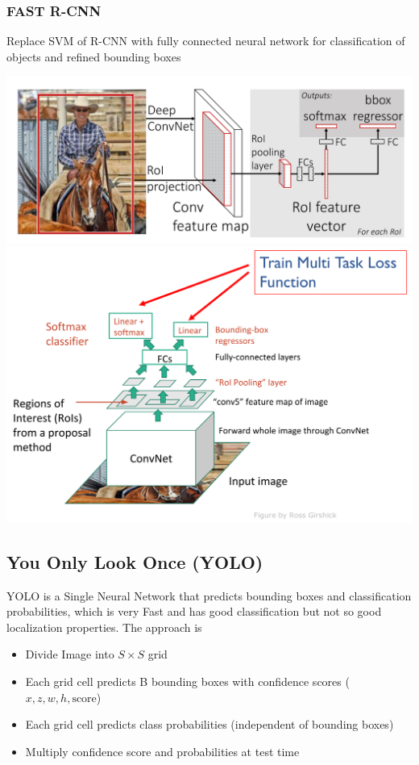 \documentclass[11pt]{article}
\theoremstyle{definition}
\begin{document}
\subsubsection{FAST R-CNN}
Replace SVM of R-CNN with fully connected neural network for classification of objects and refined bounding boxes
\begin{center}
	\includegraphics[width=0.7\linewidth]{img/fast_r-cnn_structure}
	\includegraphics[width=0.7\linewidth]{img/fast_r-cnn_structure2}
\end{center}

\subsection{You Only Look Once (YOLO)}
YOLO is a Single Neural Network that predicts bounding boxes and classification probabilities, which is very Fast and has good classification but not so good localization properties. The approach is
\begin{itemize}[label=-,nosep]
	\item Divide Image into $S \times S$ grid
	\item Each grid cell predicts B bounding boxes with confidence scores ($x, z, w, h, \text{score}$)
	\item Each grid cell predicts class probabilities (independent of bounding boxes)
	\item Multiply confidence score and probabilities at test time
\end{itemize}
\end{document}
